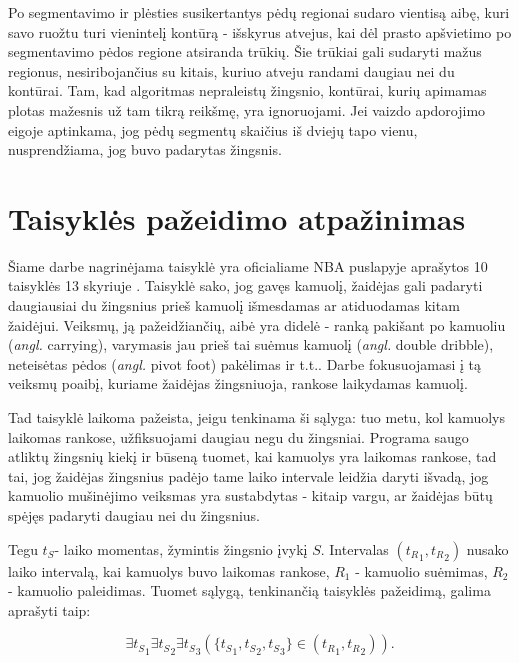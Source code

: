 \documentclass{VUMIFPSkursinis}
\begin{document}
 Po segmentavimo ir plėsties susikertantys pėdų regionai sudaro vientisą aibę, kuri savo ruožtu turi vienintelį kontūrą - išskyrus atvejus, kai dėl prasto apšvietimo po segmentavimo pėdos regione atsiranda trūkių. Šie trūkiai gali sudaryti mažus regionus, nesiribojančius su kitais, kuriuo atveju randami daugiau nei du kontūrai. Tam, kad algoritmas nepraleistų žingsnio, kontūrai, kurių apimamas plotas mažesnis už tam tikrą reikšmę, yra ignoruojami. Jei vaizdo apdorojimo eigoje aptinkama, jog pėdų segmentų skaičius iš dviejų tapo vienu, nusprendžiama, jog buvo padarytas žingsnis. 

\section{Taisyklės pažeidimo atpažinimas}
Šiame darbe nagrinėjama taisyklė yra oficialiame NBA puslapyje aprašytos 10 taisyklės 13 skyriuje \cite{NBARules}. Taisyklė sako, jog gavęs kamuolį, žaidėjas gali padaryti daugiausiai du žingsnius prieš kamuolį išmesdamas ar atiduodamas kitam žaidėjui. Veiksmų, ją pažeidžiančių, aibė yra didelė - ranką pakišant po kamuoliu (\textit{angl.} carrying), varymasis jau prieš tai suėmus kamuolį (\textit{angl.} double dribble), neteisėtas pėdos (\textit {angl.} pivot foot) pakėlimas ir t.t.. Darbe fokusuojamasi į tą veiksmų poaibį, kuriame žaidėjas žingsniuoja, rankose laikydamas kamuolį. 

Tad taisyklė laikoma pažeista, jeigu tenkinama ši sąlyga:  tuo metu, kol kamuolys laikomas rankose, užfiksuojami daugiau negu du žingsniai. Programa saugo atliktų žingsnių kiekį ir būseną tuomet, kai kamuolys yra laikomas rankose, tad tai, jog žaidėjas žingsnius padėjo tame laiko intervale leidžia daryti išvadą, jog kamuolio mušinėjimo veiksmas yra sustabdytas - kitaip vargu, ar žaidėjas būtų spėjęs padaryti daugiau nei du žingsnius. 

Tegu $t_S$- laiko momentas, žymintis žingsnio įvykį $S$. Intervalas $({t_R}_1,{ t_R}_2)$ nusako laiko intervalą, kai kamuolys buvo laikomas rankose, $R_1$ - kamuolio suėmimas, $R_2$ - kamuolio paleidimas. Tuomet sąlygą, tenkinančią taisyklės pažeidimą, galima aprašyti taip: 

\begin{equation}\label{eq:zingsniai}
\exists {t_S}_1\exists {t_S}_2 \exists {t_S}_3 ( \{{t_S}_1,  {t_S}_2,  {t_S}_3\} \in	({t_R}_1, {t_R}_2) ).
\end{equation}
\end{document}
